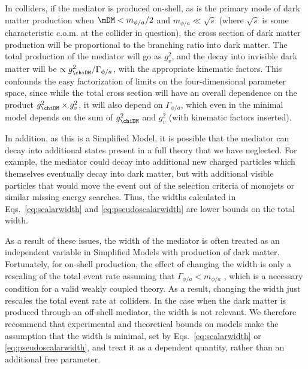 In colliders, if the mediator is produced on-shell, as is the primary mode of dark matter production when $\mDM < m_{\phi/a} /2$ and $m_{\phi/a} \ll \sqrt{\hat{s}}$ (where $\sqrt{\hat{s}}$ is some characteristic c.o.m. at the collider in question), the cross section of dark matter production will be proportional to the branching ratio into dark matter. The total production of the mediator will go as $g_v^2$, and the decay into invisible dark matter will be $\propto g_\chiDM^2/\Gamma_{\phi/a}$, with the appropriate kinematic factors. This confounds the easy factorization of limits on the four-dimensional parameter space, since while the total cross section will have an overall dependence on the product $g_\chiDM^2 \times g_v^2$, it will also depend on $\Gamma_{\phi/a}$, which even in the minimal model depends on the sum of $g_\chiDM^2$ and $g_v^2$ (with kinematic factors inserted). 

In addition, as this is a Simplified Model, it is possible that the mediator can decay into additional states present in a full theory that we have neglected. For example, the mediator could decay into additional new charged particles which themselves eventually decay into dark matter, but with additional visible particles that would move the event out of the selection criteria of monojets or similar missing energy searches. Thus, the widths calculated in Eqs.~\eqref{eq:scalarwidth} and \eqref{eq:pseudoscalarwidth} are lower bounds on the total width. 

As a result of these issues, the width of the mediator is often treated as an independent variable in Simplified Models with \schannel production of dark matter. Fortunately, for on-shell production, the effect of changing the width is only a rescaling of the total event rate assuming that $\Gamma_{\phi/a} < m_{\phi/a}$ \cite{Buckley:2014fba}, which is a necessary condition for a valid weakly coupled theory. As a result, changing the width just rescales the total event rate at colliders. In the case when the dark matter is produced through an off-shell mediator, the width is not relevant. We therefore recommend that experimental and theoretical bounds on \schannel models make the assumption that the width is minimal, set by Eqs.~\eqref{eq:scalarwidth} or \eqref{eq:pseudoscalarwidth}, and treat it as a dependent quantity, rather than an additional free parameter.

